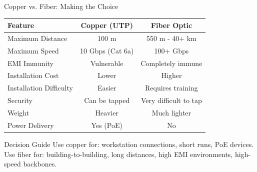 \documentclass[aspectratio=169]{beamer}
\begin{document}
\begin{frame}{Copper vs. Fiber: Making the Choice}
    \begin{table}
        \centering
        \small
        \begin{tabular}{|l|c|c|}
            \hline
            \rowcolor{networkblue!20}
            \textbf{Feature} & \textbf{Copper (UTP)} & \textbf{Fiber Optic} \\
            \hline
            Maximum Distance & 100 m & 550 m - 40+ km \\
            \hline
            Maximum Speed & 10 Gbps (Cat 6a) & 100+ Gbps \\
            \hline
            EMI Immunity & Vulnerable & Completely immune \\
            \hline
            Installation Cost & Lower & Higher \\
            \hline
            Installation Difficulty & Easier & Requires training \\
            \hline
            Security & Can be tapped & Very difficult to tap \\
            \hline
            Weight & Heavier & Much lighter \\
            \hline
            Power Delivery & Yes (PoE) & No \\
            \hline
        \end{tabular}
    \end{table}
    
    \vspace{0.3cm}
    \begin{block}{Decision Guide}
        Use copper for: workstation connections, short runs, PoE devices. Use fiber for: building-to-building, long distances, high EMI environments, high-speed backbones.
    \end{block}
\end{frame}
\end{document}
